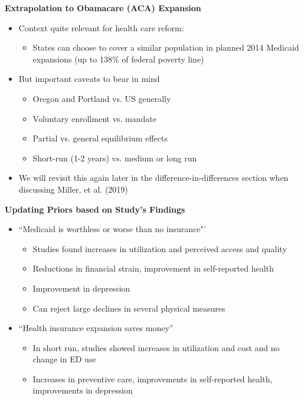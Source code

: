 \documentclass[notes=show]{beamer}
\begin{document}
\begin{frame}[plain]
	\begin{center}
	\textbf{Extrapolation to Obamacare (ACA) Expansion}
	\end{center}
	
	\begin{itemize}
	\item Context quite relevant for health care reform:	
		\begin{itemize}
		\item States can choose to cover a similar population in planned 2014 Medicaid expansions (up to 138\% of federal poverty line)
		\end{itemize}
	\item But important caveats to bear in mind
		\begin{itemize}
		\item Oregon and Portland vs. US generally
		\item Voluntary enrollment vs. mandate
		\item Partial vs. general equilibrium effects
		\item Short-run (1-2 years) vs. medium or long run
		\end{itemize}
	\item We will revisit this again later in the difference-in-differences section when discussing Miller, et al. (2019)
	\end{itemize}
\end{frame}

\begin{frame}[plain]
	\begin{center}
	\textbf{Updating Priors based on Study's Findings}
	\end{center}
	
	\begin{itemize}
	\item ``Medicaid is worthless or worse than no insurance"'	
		\begin{itemize}
		\item Studies found increases in utilization and perceived access and quality
		\item Reductions in financial strain, improvement in self-reported health
		\item Improvement in depression
		\item Can reject large declines in several physical measures
		\end{itemize}
	\item ``Health insurance expansion saves money''
		\begin{itemize}
		\item In short run, studies showed increases in utilization and cost and no change in ED use
		\item Increases in preventive care, improvements in self-reported health, improvements in depression
		\end{itemize}
	\end{itemize}
\end{frame}
\end{document}
